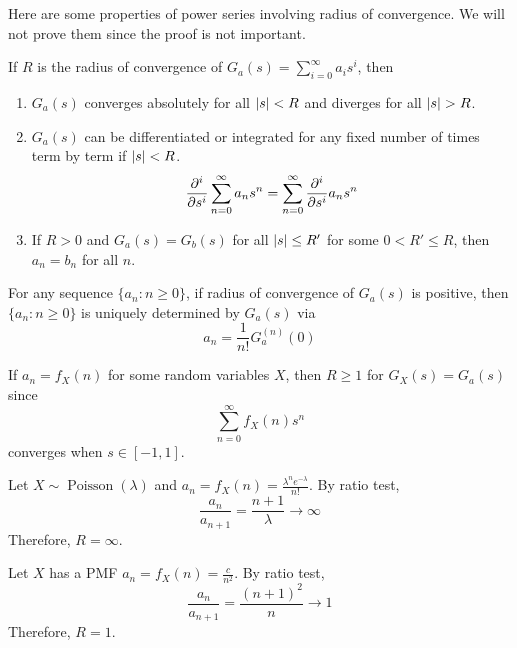 \documentclass{huhtakm-template-book}
\DeclareMathOperator{\Poisson}{Poisson}
\begin{document}
\newpage
Here are some properties of power series involving radius of convergence. We will not prove them since the proof is not important.
\begin{thm}
	If $R$ is the radius of convergence of $G_{a}(s)=\sum_{i=0}^{\infty}a_{i}s^{i}$, then
	\begin{enumerate}
		\item $G_{a}(s)$ converges absolutely for all $\left|{s}\right|<R$ and diverges for all $\abs{s}>R$.
		\item $G_{a}(s)$ can be differentiated or integrated for any fixed number of times term by term if $\left|{s}\right|<R$.
		\begin{equation*}
			\pdv*[order={i}]{\sum_{n=0}^{\infty}a_{n}s^{n}}{s}=\sum_{n=0}^{\infty}\pdv*[order={i}]{a_{n}s^{n}}{s}
		\end{equation*}
		\item If $R>0$ and $G_{a}(s)=G_{b}(s)$ for all $\left|{s}\right|\leq R'$ for some $0<R'\leq R$, then $a_{n}=b_{n}$ for all $n$.
	\end{enumerate}
\end{thm}
\begin{rem}
	For any sequence $\{a_{n}:n\geq 0\}$, if radius of convergence of $G_{a}(s)$ is positive, then $\{a_{n}:n\geq 0\}$ is uniquely determined by $G_{a}(s)$ via
	\begin{equation*}
		a_{n}=\frac{1}{n!}G_{a}^{(n)}(0)
	\end{equation*}
\end{rem}
\begin{rem}
	If $a_{n}=f_{X}(n)$ for some random variables $X$, then $R\geq 1$ for $G_{X}(s)=G_{a}(s)$ since
	\begin{equation*}
		\sum_{n=0}^{\infty}f_{X}(n)s^{n}
	\end{equation*}
	converges when $s\in[-1,1]$.
\end{rem}
\begin{eg}
	Let $X\sim\Poisson(\lambda)$ and  $a_{n}=f_{X}(n)=\frac{\lambda^{n}e^{-\lambda}}{n!}$. By ratio test,
	\begin{equation*}
		\frac{a_{n}}{a_{n+1}}=\frac{n+1}{\lambda}\to\infty
	\end{equation*}
	Therefore, $R=\infty$.
\end{eg}
\begin{eg}
	Let $X$ has a PMF $a_{n}=f_{X}(n)=\frac{c}{n^{2}}$. By ratio test,
	\begin{equation*}
		\frac{a_{n}}{a_{n+1}}=\frac{(n+1)^{2}}{n}\to 1
	\end{equation*}
	Therefore, $R=1$.
\end{eg}
\end{document}
